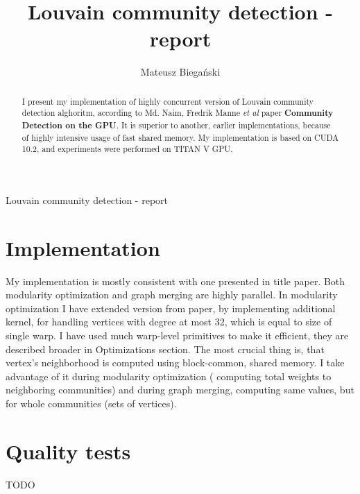 \documentclass[12pt]{article}
\begin{document}

\author{Mateusz Biegański}
\title{Louvain community detection - report}
\maketitle

\begin{center}
    \Large Louvain community detection - report \normalsize
\end{center}

\begin{abstract}
    \par I present my implementation of highly concurrent version of Louvain community detection alghoritm, according to Md. Naim, Fredrik Manne \emph{et al} paper \textbf{Community Detection on the GPU}. It is superior to another, earlier implementations, because of highly intensive usage of fast shared memory. My implementation is based on CUDA 10.2, and experiments were performed on TITAN V GPU.
\end{abstract}


\section*{\fontsize{18}{18}\selectfont Implementation}

My implementation is mostly consistent with one presented in title paper. Both modularity optimization and graph merging are highly parallel. In modularity optimization I have extended version from paper, by implementing additional kernel, for handling vertices with degree at most 32, which is equal to size of single warp. I have used much warp-level primitives to make it efficient, they are described broader in Optimizations section.
The most crucial thing is, that vertex's neighborhood is computed using block-common, shared memory. I take advantage of it during modularity optimization ( computing total weights to neighboring communities) and during graph merging, computing same values, but for whole communities (sets of vertices).

\section*{\fontsize{18}{18}\selectfont Quality tests}
TODO
\end{document}
